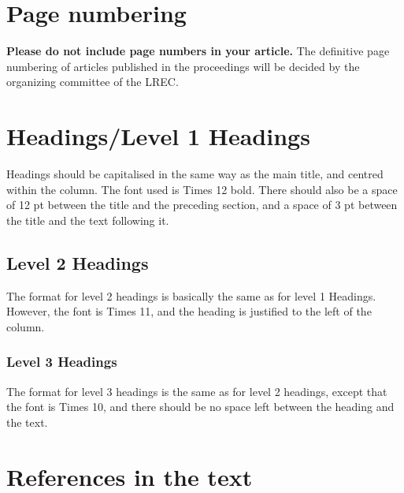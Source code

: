 \documentclass[10pt, a4paper]{article}
\begin{document}
\section{Page numbering}

\textbf{Please do not include page numbers in your article.} The definitive page numbering of articles published in the proceedings will be decided by the organizing committee of the LREC.

\section{Headings/Level 1 Headings}

Headings should be capitalised in the same way as the main title, and centred within the column. The font used is Times 12 bold. There should also be a space of 12 pt between the title and the preceding section, and a space of 3 pt between the title and the text following it.

\subsection{Level 2 Headings}

The format for level 2 headings is basically the same as for level 1 Headings. However, the font is Times 11, and the heading is justified to the left of the column.

\subsubsection{Level 3 Headings}

The format for level 3 headings is the same as for level 2 headings, except that the font is Times 10, and there should be no space left between the heading and the text.

%

\section{References in the text}
\end{document}
